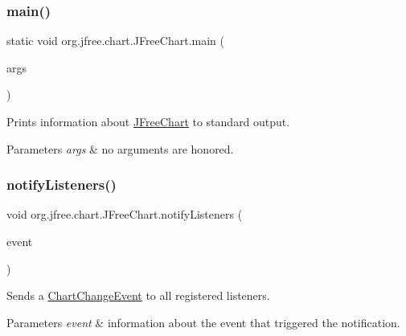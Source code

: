 \subsubsection{\texorpdfstring{main()}{main()}}
{\footnotesize\ttfamily static void org.\+jfree.\+chart.\+J\+Free\+Chart.\+main (\begin{DoxyParamCaption}\item[{String \mbox{[}$\,$\mbox{]}}]{args }\end{DoxyParamCaption})\hspace{0.3cm}{\ttfamily [static]}}

Prints information about \mbox{\hyperlink{classorg_1_1jfree_1_1chart_1_1_j_free_chart}{J\+Free\+Chart}} to standard output.


\begin{DoxyParams}{Parameters}
{\em args} & no arguments are honored. \\
\hline
\end{DoxyParams}
\mbox{\label{classorg_1_1jfree_1_1chart_1_1_j_free_chart_a4b3fe101e26f688aff9b1ba6ed5bdd29}} 
\subsubsection{\texorpdfstring{notify\+Listeners()}{notifyListeners()}\hspace{0.1cm}{\footnotesize\ttfamily [1/2]}}
{\footnotesize\ttfamily void org.\+jfree.\+chart.\+J\+Free\+Chart.\+notify\+Listeners (\begin{DoxyParamCaption}\item[{\mbox{\hyperlink{classorg_1_1jfree_1_1chart_1_1event_1_1_chart_change_event}{Chart\+Change\+Event}}}]{event }\end{DoxyParamCaption})\hspace{0.3cm}{\ttfamily [protected]}}

Sends a \mbox{\hyperlink{}{Chart\+Change\+Event}} to all registered listeners.


\begin{DoxyParams}{Parameters}
{\em event} & information about the event that triggered the notification. \\
\hline
\end{DoxyParams}
\mbox{\label{classorg_1_1jfree_1_1chart_1_1_j_free_chart_a7b4f6e4021f4a1b08ece599d26b83175}} 
